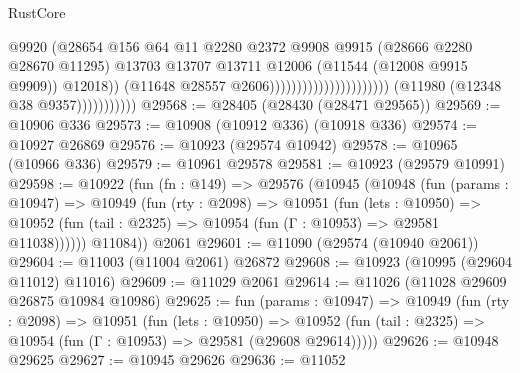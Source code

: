 \begin{lexlean}{RustCore}
\begin{coremodule}
                                                                  @9920
                                                                  (@28654
                                                                    @156
                                                                    @64
                                                                    @11
                                                                    @2280
                                                                    @2372
                                                                    @9908
                                                                    @9915
                                                                    (@28666 @2280 @28670 @11295)
                                                                    @13703
                                                                    @13707
                                                                    @13711
                                                                    @12006
                                                                    (@11544 (@12008 @9915 @9909))
                                                                    @12018))
                                                                (@11648
                                                                  @28557
                                                                  @2606))))))))))))))))))))))
                      (@11980 (@12348 @38 @9357)))))))))))
@29568 := @28405 (@28430 (@28471 @29565))
@29569 := @10906 @336
@29573 := @10908 (@10912 @336) (@10918 @336)
@29574 := @10927 @26869
@29576 := @10923 (@29574 @10942)
@29578 := @10965 (@10966 @336)
@29579 := @10961 @29578
@29581 := @10923 (@29579 @10991)
@29598 := @10922
    (fun (fn : @149) =>
    @29576
      (@10945
        (@10948
          (fun (params : @10947) =>
          @10949
            (fun (rty : @2098) =>
            @10951
              (fun (lets : @10950) =>
              @10952 (fun (tail : @2325) => @10954 (fun (Γ : @10953) => @29581 @11038))))))
        @11084))
    @2061
@29601 := @11090 (@29574 (@10940 @2061))
@29604 := @11003 (@11004 @2061) @26872
@29608 := @10923 (@10995 (@29604 @11012) @11016)
@29609 := @11029 @2061
@29614 := @11026 (@11028 @29609 @26875 @10984 @10986)
@29625 := fun (params : @10947) =>
  @10949
    (fun (rty : @2098) =>
    @10951
      (fun (lets : @10950) =>
      @10952 (fun (tail : @2325) => @10954 (fun (Γ : @10953) => @29581 (@29608 @29614)))))
@29626 := @10948 @29625
@29627 := @10945 @29626
@29636 := @11052

\end{coremodule}
\end{lexlean}
